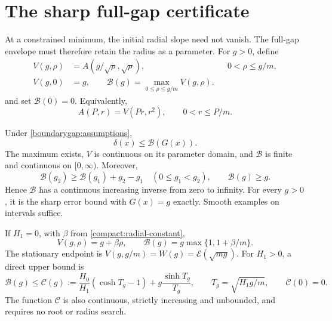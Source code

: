 \section{The sharp full-gap certificate}
\label{boundarygap:section}
At a constrained minimum, the initial radial slope need not vanish.
The full-gap envelope must therefore retain the radius as a parameter.
For $g>0$, define
\begin{equation}\label{boundarygap:definition}
 \begin{aligned}
 V(g,\rho)&=A(g/\sqrt\rho,\sqrt\rho),&&0<\rho\le g/m,\\
 V(g,0)&=g,\qquad
 \mathcal B(g)=\max_{0\le\rho\le g/m}V(g,\rho).
 \end{aligned}
\end{equation}
and set $\mathcal B(0)=0$.
Equivalently,
\begin{equation}\label{joint:radial-identity}
 A(P,r)=V(Pr,r^2),\qquad 0<r\le P/m.
\end{equation}

\begin{theorem}\label{boundarygap:main}
Under \eqref{boundarygap:assumptions},
\[
 \delta(x)\le\mathcal B(G(x)).
\]
The maximum exists, $V$ is continuous on its parameter domain, and
$\mathcal B$ is finite and continuous on $[0,\infty)$. Moreover,
\begin{equation}\label{boundarygap:growth}
 \mathcal B(g_2)\ge\mathcal B(g_1)+g_2-g_1
 \quad(0\le g_1<g_2),\qquad \mathcal B(g)\ge g.
\end{equation}
Hence $\mathcal B$ has a continuous increasing inverse from zero to
infinity. For every $g>0$, it is the sharp error bound with $G(x)=g$
exactly. Smooth examples on intervals suffice.

If $H_1=0$, with $\beta$ from \eqref{compact:radial-constant},
\begin{equation}\label{boundarygap:constant}
 V(g,\rho)=g+\beta\rho,
 \qquad \mathcal B(g)=g\max\{1,1+\beta/m\}.
\end{equation}
The stationary endpoint is $V(g,g/m)=W(g)=\mathcal E(\sqrt{mg})$.
For $H_1>0$, a direct upper bound is
\begin{equation}\label{boundarygap:elementary-formula}
 \mathcal B(g)\le\mathcal C(g):=
 \frac{H_0}{H_1}(\cosh T_g-1)+g\frac{\sinh T_g}{T_g},
 \qquad T_g=\sqrt{H_1g/m},\qquad \mathcal C(0)=0.
\end{equation}
The function $\mathcal C$ is also continuous, strictly increasing and
unbounded, and requires no root or radius search.
\end{theorem}

